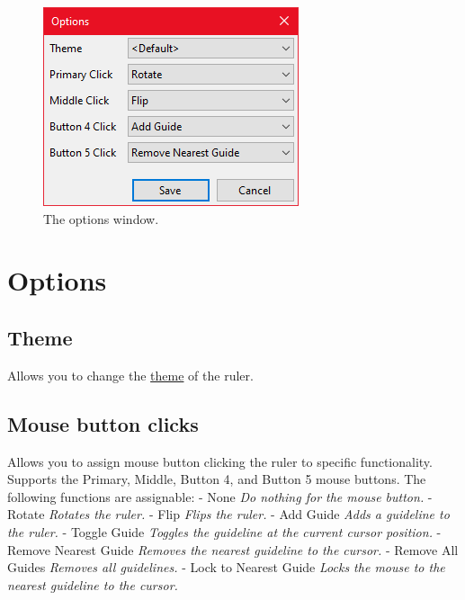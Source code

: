 \documentclass[
]{book}
\begin{document}
\begin{figure}
\includegraphics[width=1\linewidth]{images/options} \caption{The options window.}\label{fig:unnamed-chunk-4}
\end{figure}

\hypertarget{options}{%
\section{Options}\label{options}}

\hypertarget{theme}{%
\subsection{Theme}\label{theme}}

Allows you to change the \protect\hyperlink{themes}{theme} of the ruler.

\hypertarget{mouse-button-clicks}{%
\subsection{Mouse button clicks}\label{mouse-button-clicks}}

Allows you to assign mouse button clicking the ruler to specific functionality.
Supports the Primary, Middle, Button 4, and Button 5 mouse buttons.
The following functions are assignable:
- None \emph{Do nothing for the mouse button.}
- Rotate \emph{Rotates the ruler.}
- Flip \emph{Flips the ruler.}
- Add Guide \emph{Adds a guideline to the ruler.}
- Toggle Guide \emph{Toggles the guideline at the current cursor position.}
- Remove Nearest Guide \emph{Removes the nearest guideline to the cursor.}
- Remove All Guides \emph{Removes all guidelines.}
- Lock to Nearest Guide \emph{Locks the mouse to the nearest guideline to the cursor.}
\end{document}
